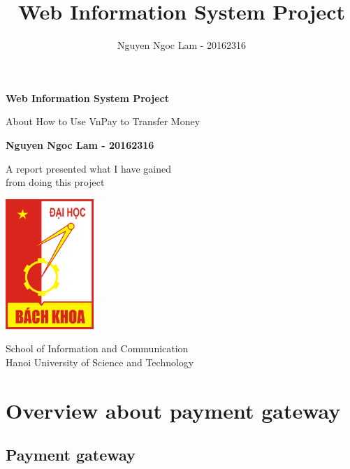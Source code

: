 \documentclass[12pt,a4paper]{article}
\title{Web Information System Project}
\date{\displaydate{date}}
\author{Nguyen Ngoc Lam - 20162316}
\begin{document}
\begin{titlepage}
	\begin{center}
		\vspace*{0.5cm}
		\Huge
		\textbf{Web Information System Project}

		\vspace{0.5cm}
		\LARGE
		About How to Use VnPay to Transfer Money
            
		\vspace{1.5cm}

		\textbf{Nguyen Ngoc Lam - 20162316}

		\vfill
            
		A report presented what I have gained \\
		from doing this project
            
		\vspace{0.8cm}
     
		\includegraphics[width=0.25\textwidth]{Logo_Hust.png}

		\Large
		School of Information and Communication\\
		Hanoi University of Science and Technology\\
	\end{center}
\end{titlepage}
\newpage
{}
\tableofcontents
\newpage

\section{Overview about payment gateway}
\subsection{Payment gateway}
\end{document}
